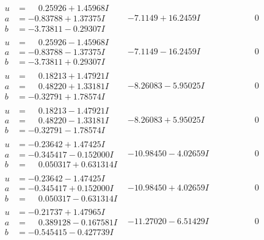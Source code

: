 \documentclass[1p]{elsarticle_modified}
\theoremstyle{definition}
\begin{document}
$$\begin{array}{c|c|c}
\begin{aligned}
u &= \phantom{-}0.25926 + 1.45968 I \\
a &= -0.83788 + 1.37375 I \\
b &= -3.73811 - 0.29307 I\end{aligned}
 & -7.1149 + 16.2459 I & \phantom{-0.000000 } 0 \\ \hline\begin{aligned}
u &= \phantom{-}0.25926 - 1.45968 I \\
a &= -0.83788 - 1.37375 I \\
b &= -3.73811 + 0.29307 I\end{aligned}
 & -7.1149 - 16.2459 I & \phantom{-0.000000 } 0 \\ \hline\begin{aligned}
u &= \phantom{-}0.18213 + 1.47921 I \\
a &= \phantom{-}0.48220 + 1.33181 I \\
b &= -0.32791 + 1.78574 I\end{aligned}
 & -8.26083 - 5.95025 I & \phantom{-0.000000 } 0 \\ \hline\begin{aligned}
u &= \phantom{-}0.18213 - 1.47921 I \\
a &= \phantom{-}0.48220 - 1.33181 I \\
b &= -0.32791 - 1.78574 I\end{aligned}
 & -8.26083 + 5.95025 I & \phantom{-0.000000 } 0 \\ \hline\begin{aligned}
u &= -0.23642 + 1.47425 I \\
a &= -0.345417 - 0.152000 I \\
b &= \phantom{-}0.050317 + 0.631314 I\end{aligned}
 & -10.98450 - 4.02659 I & \phantom{-0.000000 } 0 \\ \hline\begin{aligned}
u &= -0.23642 - 1.47425 I \\
a &= -0.345417 + 0.152000 I \\
b &= \phantom{-}0.050317 - 0.631314 I\end{aligned}
 & -10.98450 + 4.02659 I & \phantom{-0.000000 } 0 \\ \hline\begin{aligned}
u &= -0.21737 + 1.47965 I \\
a &= \phantom{-}0.389128 - 0.167581 I \\
b &= -0.545415 - 0.427739 I\end{aligned}
 & -11.27020 - 6.51429 I & \phantom{-0.000000 } 0 \\ \hline\begin{aligned}

\end{aligned}
\end{array}$$
\end{document}
